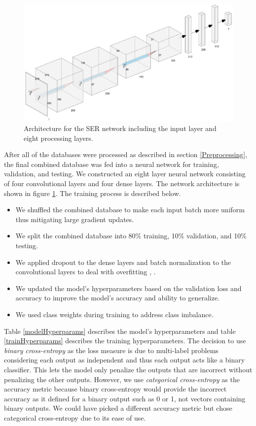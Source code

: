 \documentclass[a4paper, 10pt, conference]{ieeeconf}      %
\begin{document}
\begin{figure}
	\centering
	\hspace{6mm}
	\includegraphics[width=\linewidth]{neural_network_architecture.png}
	\caption{Architecture for the SER network including the input layer and eight processing layers.}
	\label{neuralNetworkArchitecture}
\end{figure}

After all of the databases were processed as described in section \ref{Preprocessing}, the final combined database was fed into a neural network for training, validation, and testing. We constructed an eight layer neural network consisting of four convolutional layers and four dense layers. The network architecture is shown in figure \ref{neuralNetworkArchitecture}. The training process is described below.
\begin{itemize}
	\item We shuffled the combined database to make each input batch more uniform thus mitigating large gradient updates.
	\item We split the combined database into 80\% training, 10\% validation, and 10\% testing.
	\item We applied dropout to the dense layers and batch normalization to the convolutional layers to deal with overfitting \cite{Srivastava2014}, \cite{Ioffe2015}.
	\item We updated the model's hyperparameters based on the validation loss and accuracy to improve the model's accuracy and ability to generalize.
	\item We used class weights during training to address class imbalance.
\end{itemize}

Table \ref{modelHyperparams} describes the model's hyperparameters and table \ref{trainHyperparams} describes the training hyperparameters. The decision to use \textit{binary cross-entropy} as the loss measure is due to multi-label problems considering each output as independent and thus each output acts like a binary classifier. This lets the model only penalize the outputs that are incorrect without penalizing the other outputs. However, we use \textit{categorical cross-entropy} as the accuracy metric because binary cross-entropy would provide the incorrect accuracy as it defined for a binary output such as 0 or 1, not vectors containing binary outputs. We could have picked a different accuracy metric but chose categorical cross-entropy due to its ease of use.
\end{document}
